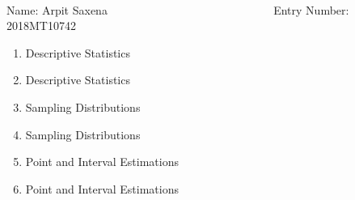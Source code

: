 \documentclass[12pt, oneside]{article}
\begin{document}
\setlength{\textheight}{8.5in}
\\





\vskip 0.5cm

\noindent Name: Arpit Saxena ~  ~~~~~ ~~~~ ~~~~~~~~~~~~~~~~ Entry Number: 2018MT10742 ~~~~~~~~~~~~~



\vskip 0.5cm



\begin{enumerate}
	



\item	Descriptive Statistics


\item	Descriptive Statistics


\item	Sampling Distributions



\item	Sampling Distributions 


\item	Point and Interval Estimations




\item	Point and Interval Estimations


\end{enumerate}
\end{document}
